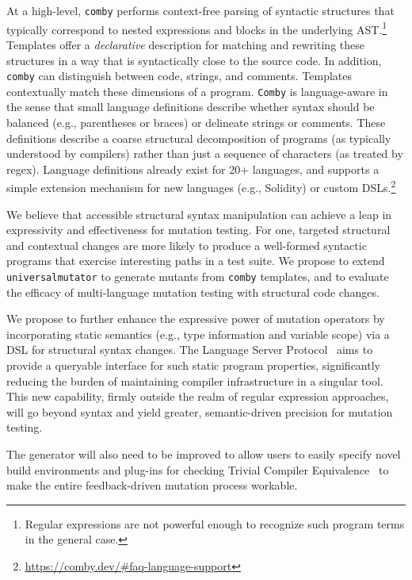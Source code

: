 At a high-level, {\tt comby} performs
context-free
parsing of syntactic structures that typically correspond to nested expressions and blocks in the underlying AST.\footnote{Regular expressions are not powerful enough to recognize such program terms in the general case.} Templates offer a \emph{declarative} description for matching and rewriting these structures in a way that is syntactically close to the source code.
In addition, {\tt comby} can distinguish between code, strings, and comments. Templates contextually match these dimensions of a program. %
{\tt Comby} is language-aware in the sense that small language definitions describe whether syntax should be balanced (e.g., parentheses or braces) or delineate strings or comments. These definitions describe a coarse structural decomposition of programs (as typically understood by compilers) rather than just a sequence of characters (as treated by regex). Language definitions already exist for 20+ languages, and supports a simple extension mechanism for new languages (e.g., Solidity) or custom DSLs.\footnote{\url{https://comby.dev/\#faq-language-support}}

We believe that accessible structural syntax manipulation can achieve a leap in
expressivity and effectiveness for mutation testing. %
For one, targeted structural and contextual changes are
more likely to produce a well-formed syntactic programs
that exercise interesting paths in a test suite.
We propose to extend {\tt universalmutator}
to generate mutants from {\tt comby} templates, and to evaluate the efficacy of
multi-language mutation testing with structural code changes.

We propose to further enhance the expressive power of mutation operators by
incorporating static semantics (e.g., type information and variable scope) via a
DSL for structural syntax changes. The Language Server Protocol~\cite{lsp-web} aims to
provide a queryable interface for such static program properties, significantly
reducing the burden of maintaining compiler infrastructure in a singular tool.
This new capability, firmly outside the realm of regular
expression approaches, will go beyond syntax and yield greater, semantic-driven precision for mutation testing.

The generator will also need to be improved to allow users
to easily specify novel build environments and plug-ins for checking
Trivial Compiler Equivalence~\cite{TCE} to make the entire
feedback-driven mutation process workable.

